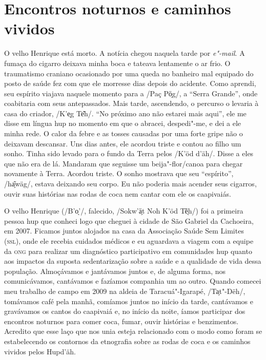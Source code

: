 
\section{Encontros noturnos e caminhos
vividos}\label{encontros-noturnos-e-caminhos-vividos}

O velho Henrique está morto. A notícia chegou naquela tarde por
\emph{e"-mail}. A fumaça do cigarro deixava minha boca e tateava
lentamente o ar frio. O traumatismo craniano ocasionado por uma queda no
banheiro mal equipado do posto de saúde fez com que ele morresse dias
depois do acidente. Como aprendi, seu espírito viajava naquele momento
para a /Paç Pö̗g/, a ``Serra Grande'', onde coabitaria com seus
antepassados. Mais tarde, ascendendo, o percurso o levaria à casa do
criador, /K'e̖g Te͂h/. ``No próximo ano não estarei mais aqui'', ele me
disse em língua hup no momento em que o abracei, despedi"-me, e dei a ele
minha rede. O calor da febre e as tosses causadas por uma forte gripe
não o deixavam descansar. Uns dias antes, ele acordou triste e contou ao
filho um sonho. Tinha sido levado para o fundo da Terra pelos /K'öd
d'äh/. Disse a eles que não era de lá. Mandaram que seguisse um
beija"-flor/canoa para chegar novamente à Terra. Acordou triste. O sonho
mostrava que seu ``espírito'', /ha̗͂wäg/, estava deixando seu corpo. Eu
não poderia mais acender seus cigarros, ouvir suas histórias nas rodas
de coca nem cantar com ele os caapivaiás.

O velho Henrique (/B'o̖'/, falecido, /Sokw'ä̗t Noh K'öd Tẽ̖h/) foi
a primeira pessoa hup que conheci logo que cheguei à cidade de São
Gabriel da Cachoeira, em 2007. Ficamos juntos alojados na casa da
Associação Saúde Sem Limites (\textsc{ssl}), onde ele recebia cuidados médicos e
eu aguardava a viagem com a equipe da \textsc{ong} para realizar um diagnóstico
participativo em comunidades hup quanto aos impactos da suposta
sedentarização sobre a saúde e a qualidade de vida dessa população.
Almoçávamos e jantávamos juntos e, de alguma forma, nos comunicávamos,
cantávamos e fazíamos companhia um ao outro. Quando comecei meu trabalho
de campo em 2009 na aldeia de Taracuá"-Igarapé, /Ta̗t"-Dëh/, tomávamos café
pela manhã, comíamos juntos no início da tarde, cantávamos e gravávamos
os cantos do caapivaiá e, no início da noite, íamos participar dos
encontros noturnos para comer coca, fumar, ouvir histórias e
benzimentos. Acredito que esse laço que nos unia esteja relacionado com
o modo como foram se estabelecendo os contornos da etnografia sobre as
rodas de coca e os caminhos vividos pelos Hupd'äh.

